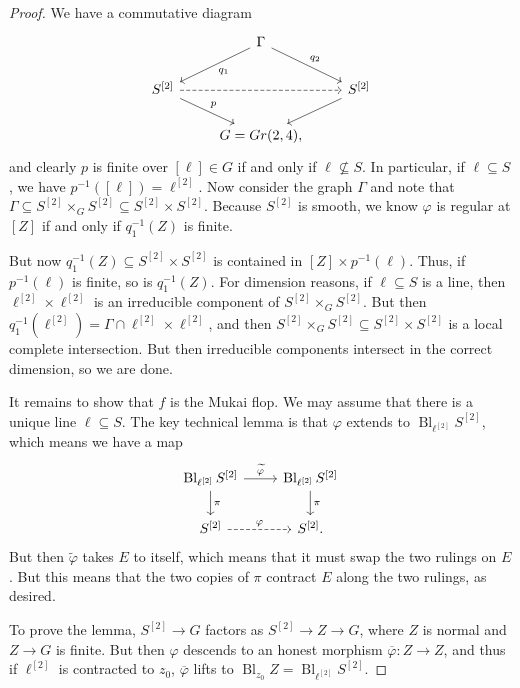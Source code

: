 \documentclass[leqno, openany]{memoir}
\theoremstyle{definition}
\theoremstyle{remark}
\theoremstyle{plain}
\theoremstyle{definition}
\theoremstyle{remark}
\newcommand{\ol}[1]{\overline{#1}}
\newcommand{\wt}[1]{\widetilde{#1}}
\DeclareMathOperator{\Bl}{Bl}
\begin{document}
\begin{proof}\leavevmode
    We have a commutative diagram
    \begin{equation*}
    \begin{tikzcd}
        & \Gamma \ar{dl}{q_1} \ar{dr}{q_2} \\
        S^{[2]} \ar[dashrightarrow]{rr} \ar{dr}{p} & & S^{[2]} \ar{dl} \\
        & G = Gr(2,4),
    \end{tikzcd}
    \end{equation*}
    and clearly $p$ is finite over $[\ell] \in G$ if and only if $\ell \not\subseteq S$. In particular, if $\ell \subseteq S$, we have $p^{-1}([\ell]) = \ell^{[2]}$. Now consider the graph $\Gamma$ and note that $\Gamma \subseteq S^{[2]} \times_G S^{[2]} \subseteq S^{[2]} \times S^{[2]}$. Because $S^{[2]}$ is smooth, we know $\varphi$ is regular at $[Z]$ if and only if $q_1^{-1}(Z)$ is finite.

    But now $q_1^{-1}(Z) \subseteq S^{[2]} \times S^{[2]}$ is contained in $[Z] \times p^{-1}(\ell)$. Thus, if $p^{-1}(\ell)$ is finite, so is $q_1^{-1}(Z)$. For dimension reasons, if $\ell \subseteq S$ is a line, then $\ell^{[2]} \times \ell^{[2]}$ is an irreducible component of $S^{[2]} \times_G S^{[2]}$. But then $q_1^{-1}(\ell^{[2]}) = \Gamma \cap \ell^{[2]} \times \ell^{[2]}$, and then $S^{[2]} \times_G S^{[2]} \subseteq S^{[2]} \times S^{[2]}$ is a local complete intersection. But then irreducible components intersect in the correct dimension, so we are done.

    It remains to show that $f$ is the Mukai flop. We may assume that there is a unique line $\ell \subseteq S$. The key technical lemma is that $\varphi$ extends to $\Bl_{\ell^{[2]}} S^{[2]}$, which means we have a map
    \begin{equation*}
    \begin{tikzcd}
        \Bl_{\ell^{[2]}} S^{[2]} \ar{r}{\wt{\varphi}} \ar{d}{\pi} & \Bl_{\ell^{[2]}} S^{[2]} \ar{d}{\pi} \\
        S^{[2]} \ar[dashrightarrow]{r}{\varphi} & S^{[2]}.
    \end{tikzcd}
    \end{equation*}
    But then $\wt{\varphi}$ takes $E$ to itself, which means that it must swap the two rulings on $E$. But this means that the two copies of $\pi$ contract $E$ along the two rulings, as desired.

    To prove the lemma, $S^{[2]} \to G$ factors as $S^{[2]} \to Z \to G$, where $Z$ is normal and $Z \to G$ is finite. But then $\varphi$ descends to an honest morphism $\ol{\varphi} \colon Z \to Z$, and thus if $\ell^{[2]}$ is contracted to $z_0$, $\ol{\varphi}$ lifts to $\Bl_{z_0} Z = \Bl_{\ell^{[2]}} S^{[2]}$.
\end{proof}
\end{document}
